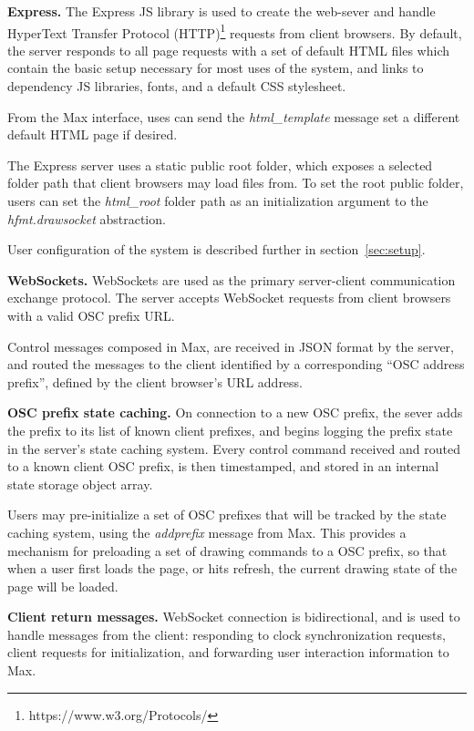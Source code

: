 \medskip
\noindent
\textbf{Express.}
The Express JS library is used to create the web-sever and handle HyperText Transfer Protocol (HTTP)\footnote{https://www.w3.org/Protocols/} requests from client browsers. 
By default, the server responds to all page requests with a set of default HTML files which contain the basic setup necessary for most uses of the \drawsocket system, and links to dependency JS libraries, fonts, and a default CSS stylesheet.

From the Max interface, uses can send the \textit{html\_template} message set a different default HTML page if desired.

The Express server uses a static public root folder, which exposes a selected folder path that client browsers may load files from. 
To set the root public folder, users can set the \textit{html\_root} folder path as an initialization argument to the \textit{hfmt.drawsocket} abstraction.

User configuration of the system is described further in section~\ref{sec:setup}.

\medskip
\noindent
\textbf{WebSockets.}
WebSockets are used as the primary server-client communication exchange protocol.
The server accepts WebSocket requests from client browsers with a valid OSC prefix URL.

Control messages composed in Max, are received in JSON format by the server, and routed the messages to the client identified by a corresponding ``OSC address prefix'', defined by the client browser's URL address.

\medskip
\noindent
\textbf{OSC prefix state caching.}
On connection to a new OSC prefix, the sever adds the prefix to its list of known client prefixes, and begins logging the prefix state in the server's state caching system. 
Every control command received and routed to a known client OSC prefix, is then timestamped, and stored in an internal state storage object array.

Users may pre-initialize a set of OSC prefixes that will be tracked by the state caching system, using the \textit{addprefix} message from Max.
This provides a mechanism for preloading a set of drawing commands to a OSC prefix, so that when a user first loads the page, or hits refresh, the current drawing state of the page will be loaded.

\medskip
\noindent
\textbf{Client return messages.}
WebSocket connection is bidirectional, and is used to handle messages from the client: responding to clock synchronization requests, client requests for initialization, and forwarding user interaction information to Max.

